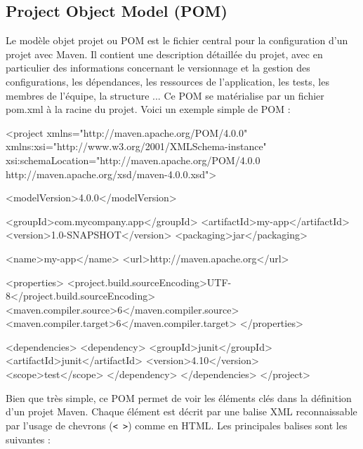 \documentclass[a4paper,11pt]{article}
\begin{document}
\subsection{Project Object Model (POM)}
Le modèle objet projet ou POM est le fichier central pour la configuration d'un projet avec Maven. Il contient une description 
détaillée du projet, avec en particulier des informations concernant le versionnage et la gestion des configurations, 
les dépendances, les ressources de l'application, les tests, les membres de l'équipe, la structure ...
Ce POM se matérialise par un fichier pom.xml à la racine du projet. Voici un exemple simple de POM :
\begin{code_xml}
<project xmlns="http://maven.apache.org/POM/4.0.0" 
         xmlns:xsi="http://www.w3.org/2001/XMLSchema-instance"
         xsi:schemaLocation="http://maven.apache.org/POM/4.0.0 http://maven.apache.org/xsd/maven-4.0.0.xsd">
         
  <modelVersion>4.0.0</modelVersion>

  <groupId>com.mycompany.app</groupId>
  <artifactId>my-app</artifactId>
  <version>1.0-SNAPSHOT</version>
  <packaging>jar</packaging>

  <name>my-app</name>
  <url>http://maven.apache.org</url>

  <properties>
    <project.build.sourceEncoding>UTF-8</project.build.sourceEncoding>
    <maven.compiler.source>6</maven.compiler.source>
    <maven.compiler.target>6</maven.compiler.target>
  </properties>

  <dependencies>
    <dependency>
      <groupId>junit</groupId>
      <artifactId>junit</artifactId>
      <version>4.10</version>
      <scope>test</scope>
    </dependency>
  </dependencies>
</project>
\end{code_xml}
Bien que très simple, ce POM permet de voir les éléments clés dans la définition d'un projet Maven. Chaque élément est 
décrit par une balise XML reconnaissable par l'usage de chevrons (\texttt{< >}) comme en HTML. 
Les principales balises sont les suivantes :
\end{document}
